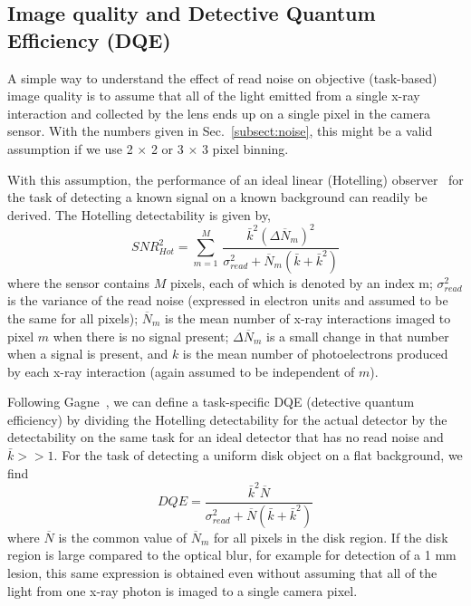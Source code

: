 \subsection{Image quality and Detective Quantum Efficiency (DQE)}
\label{subsect:image_quality_DQE}
A simple way to understand the effect of read noise on objective (task-based) image quality is to assume that all of the light emitted from a single x-ray interaction and collected by the lens ends up on a single pixel in the camera sensor. With the numbers given in Sec.~\ref{subsect:noise}, this might be a valid assumption if we use 2 $\times$ 2 or 3 $\times$ 3 pixel binning. 

With this assumption, the performance of an ideal linear (Hotelling) observer~\citep{Barrett2004} for the task of detecting a known signal on a known background can readily be derived.  The Hotelling detectability is given by,
%
\begin{equation}
SNR_{Hot}^2 = \sum\limits_{m=1}^{M}\, \frac{\bar{k}^2 (\Delta \overline{N}_m)^2}{\sigma_{read}^2 + \overline{N}_m (\bar{k} + \bar{k}^2)}
\label{eq:SNR2_hot}
\end{equation}
%
where the sensor contains $M$ pixels, each of which is denoted by an index m; $\sigma_{read}^2$ is the variance of the read noise (expressed in electron units and assumed to be the same for all pixels); $\overline{N}_m$ is the mean number of x-ray interactions imaged to pixel $m$ when there is no signal present; $\Delta \overline{N}_m$ is a small change in that number when a signal is present, and $k$ is the mean number of photoelectrons produced by each x-ray interaction (again assumed to be independent of $m$).

Following Gagne~\citep{Gagne2003}, we can define a task-specific DQE (detective quantum efficiency) by dividing the Hotelling detectability for the actual detector by the detectability on the same task for an ideal detector that has no read noise and $\bar{k}>> 1$.  For the task of detecting a uniform disk object on a flat background, we find
%
\begin{equation}
DQE = \frac{\bar{k}^2 \overline{N}}{\sigma_{read}^2 + \overline{N}(\bar{k} + \bar{k}^2)}
\label{eq:DQE}
\end{equation}
%
where $\overline{N}$ is the common value of $\overline{N}_m$ for all pixels in the disk region. If the disk region is large compared to the optical blur, for example for detection of a 1 mm lesion, this same expression is obtained even without assuming that all of the light from one x-ray photon is imaged to a single camera pixel.

